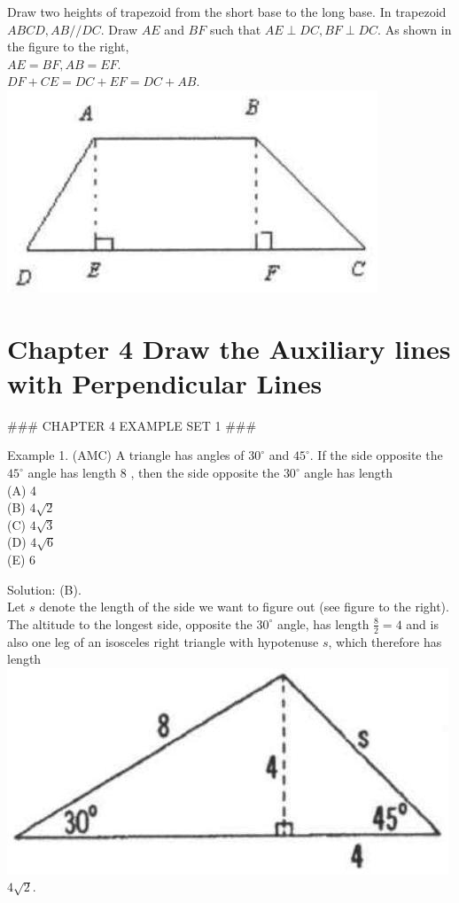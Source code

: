 \documentclass[10pt]{article}
\begin{document}
Draw two heights of trapezoid from the short base to the long base.
In trapezoid \(A B C D, A B / / D C\). Draw \(A E\) and \(B F\) such that \(A E \perp D C, B F \perp D C\). As shown in the figure to the right,\\
\(A E=B F, A B=E F\).\\
\(D F+C E=D C+E F=D C+A B\).\\
\includegraphics[max width=\textwidth, center]{2025_04_17_97bc1f7e44d93c271a88g-074(2)}

\section*{Chapter 4 Draw the Auxiliary lines with Perpendicular Lines}

### CHAPTER 4 EXAMPLE SET 1 ###

Example 1. (AMC) A triangle has angles of \(30^{\circ}\) and \(45^{\circ}\). If the side opposite the \(45^{\circ}\) angle has length 8 , then the side opposite the \(30^{\circ}\) angle has length\\
(A) 4\\
(B) \(4 \sqrt{2}\)\\
(C) \(4 \sqrt{3}\)\\
(D) \(4 \sqrt{6}\)\\
(E) 6

Solution: (B).\\
Let \(s\) denote the length of the side we want to figure out (see figure to the right). The altitude to the longest side, opposite the \(30^{\circ}\) angle, has length \(\frac{8}{2}=4\) and is also one leg of an isosceles right triangle with hypotenuse \(s\), which therefore has length\\
\includegraphics[max width=\textwidth]{2025_04_17_97bc1f7e44d93c271a88g-075(1)} \(4 \sqrt{2}\).
\end{document}

